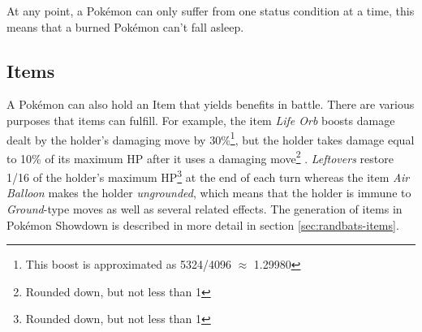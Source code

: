 At any point, a Pokémon can only suffer from one status condition at a time, this means that a 
burned Pokémon can't fall asleep.

\subsection{Items}
\label{sec:items}
A Pokémon can also hold an Item that yields benefits in battle. There are various purposes that items 
can fulfill. For example, the item \textit{Life Orb} boosts damage dealt by the holder's damaging move
by 30\%\footnote{This boost is approximated as 5324/4096 $\approx$ 1.29980}, but the holder takes
damage equal to 10\% of its maximum \ac{HP} after it uses a damaging move\footnote{Rounded down, 
but not less than 1} \cite{Bulbapedia:LifeOrb}. \textit{Leftovers} restore 1/16 of the holder's
maximum \ac{HP}\footnote{Rounded down, but not less than 1} at the end of each turn whereas the item
\textit{Air Balloon} makes the holder \textit{ungrounded}, which means that the holder is immune to
\textit{Ground}-type moves as well as several related effects\cite{Bulbapedia:AirBalloon}. The 
generation of items in Pokémon Showdown is described in more detail in section \ref{sec:randbats-items}.
